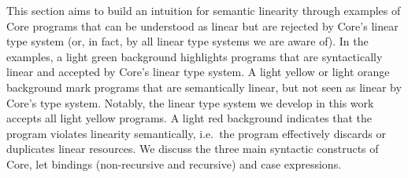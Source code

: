\documentclass[acmsmall,review,anonymous,screen]{acmart}
\newcommand{\workingcolorname}{light green}
\newcommand{\notyetcolorname}{light yellow}
\newcommand{\nowaycolorname}{light red}
\newcommand{\limitationcolorname}{light orange}
\begin{document}
This section aims to build an intuition for semantic linearity through examples
of Core programs that can be understood as linear but are rejected by Core's
linear type system (or, in fact, by all linear type systems we are aware of).
%
%
%
In the examples, a \colorbox{working}{\workingcolorname} background highlights
programs that are syntactically linear and accepted by Core's linear type
system.
%
A \colorbox{notyet}{\notyetcolorname} or
\colorbox{limitation}{\limitationcolorname} background mark programs that are
semantically linear, but not seen as linear by Core's type system.
%
Notably, the linear type system we develop in this work accepts all
\colorbox{notyet}{\notyetcolorname} programs.
%
A \colorbox{noway}{\nowaycolorname} background indicates that the program
violates linearity semantically, i.e.~the program effectively
discards or duplicates linear resources. We discuss the three main
syntactic constructs of Core, let bindings (non-recursive and
recursive) and case expressions.

\end{document}
